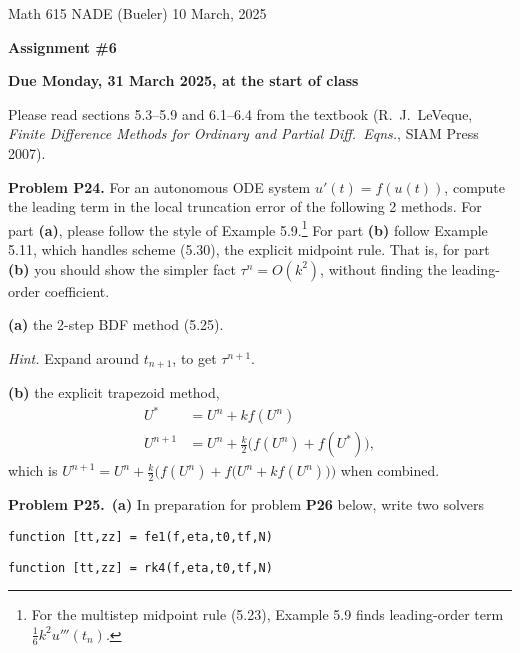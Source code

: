 \documentclass[12pt]{amsart}
\newcommand{\prob}[1]{\bigskip\noindent\textbf{#1}\quad }
\newcommand{\epart}[1]{\medskip\noindent\textbf{(#1)}\quad }
\newcommand{\ppart}[1]{\,\textbf{(#1)}\quad }
\begin{document}
\scriptsize \noindent Math 615 NADE (Bueler) \hfill 10 March, 2025
\normalsize

\medskip\bigskip

\Large\centerline{\textbf{Assignment \#6}}
\large
\bigskip

\centerline{\textbf{Due Monday, 31 March 2025, at the start of class}}
\bigskip
\normalsize

\thispagestyle{empty}

\bigskip
Please read sections 5.3--5.9 and 6.1--6.4 from the textbook (R.~J.~LeVeque, \emph{Finite Difference Methods for Ordinary and Partial Diff.~Eqns.}, SIAM Press 2007).

\medskip


\prob{Problem P24.}  For an autonomous ODE system $u'(t) = f(u(t))$, compute the leading term in the local truncation error of the following 2 methods.  For part \textbf{(a)}, please follow the style of Example 5.9.\footnote{For the multistep midpoint rule (5.23), Example 5.9 finds leading-order term $\frac{1}{6} k^2 u'''(t_n)$.}  For part \textbf{(b)} follow Example 5.11, which handles scheme (5.30), the explicit midpoint rule.  That is, for part \textbf{(b)} you should show the simpler fact $\tau^n=O(k^2)$, without finding the leading-order coefficient.

\epart{a} the 2-step BDF method (5.25).

\medskip
\noindent \emph{Hint.}  Expand around $t_{n+1}$, to get $\tau^{n+1}$.

\epart{b} the explicit trapezoid method,
\begin{align*}
U^\ast &= U^n + k f(U^n) \\
U^{n+1} &= U^n + \frac{k}{2} \Big(f(U^n) + f(U^\ast)\Big),
\end{align*}
which is $U^{n+1} = U^n + \frac{k}{2} \Big(f(U^n) + f\big(U^n + k f(U^n)\big)\Big)$ when combined.


\prob{Problem P25.}  \ppart{a}  In preparation for problem \textbf{P26} below, write two solvers

\centerline{\texttt{function [tt,zz] = fe1(f,eta,t0,tf,N)}}

\centerline{\texttt{function [tt,zz] = rk4(f,eta,t0,tf,N)}}
\end{document}
